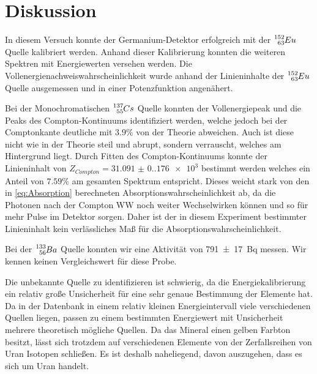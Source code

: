 \newpage
\section{Diskussion}

In diesem Versuch konnte der Germanium-Detektor erfolgreich mit der
$\ce{^{152}_{63}}Eu$ Quelle kalibriert werden. Anhand dieser Kalibrierung
konnten die weiteren Spektren mit Energiewerten versehen werden. Die
Vollenergienachweiswahrscheinlichkeit wurde anhand der Linieninhalte der
$\ce{^{152}_{63}}Eu$ Quelle ausgemessen und in einer Potenzfunktion angenähert.

Bei der Monochromatischen $\ce{^{137}_{55}}Cs$ Quelle konnten der
Vollenergiepeak und die Peaks des Compton-Kontinuums identifiziert werden,
welche jedoch bei der Comptonkante deutliche mit $3.9\%$ von der Theorie
abweichen. Auch ist diese nicht wie in der Theorie steil und abrupt, sondern
verrauscht, welches am Hintergrund liegt. Durch Fitten des Compton-Kontinuums
konnte der Linieninhalt von $Z_{Compton}=\num{31.091(0.176)e3}$ bestimmt werden
welches ein Anteil von $7.59\%$ am gesamten Spektrum entspricht. Dieses weicht
stark von den in \eqref{eq:Absorption} berechneten
Absorptionswahrscheinlichkeit ab, da die Photonen nach der Compton WW noch
weiter Wechselwirken können und so für mehr Pulse im Detektor sorgen. 
Daher ist der in diesem Experiment bestimmter Linieninhalt kein verlässliches Maß für die Absorptionswahrscheinlichkeit.

Bei der $\ce{^{133}_{56}}Ba$ Quelle konnten wir eine Aktivität von
\qty{791(17)}{\becquerel} messen. Wir kennen keinen Vergleichswert für diese
Probe.

Die unbekannte Quelle zu identifizieren ist schwierig, da die
Energiekalibrierung ein relativ große Unsicherheit für eine sehr genaue Bestimmung
der Elemente hat. Da in der Datenbank in einem relativ kleinen Energieintervall
viele verschiedenen Quellen liegen, passen zu einem bestimmten Energiewert mit Unsicherheit mehrere theoretisch mögliche Quellen. 
Da das Mineral einen gelben Farbton besitzt, lässt sich trotzdem auf verschiedenen Elemente von der Zerfallsreihen von Uran Isotopen schließen. 
Es ist deshalb naheliegend, davon auszugehen, dass es sich um Uran handelt.

\newpage
\printbibliography


